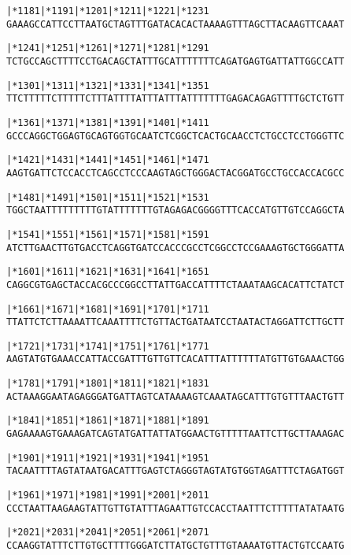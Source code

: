 \documentclass{article}
\begin{document}
\begin{alltt}
   |*1181    |*1191    |*1201    |*1211    |*1221    |*1231 
GAAAGCCATTCCTTAATGCTAGTTTGATACACACTAAAAGTTTAGCTTACAAGTTCAAAT

   |*1241    |*1251    |*1261    |*1271    |*1281    |*1291 
TCTGCCAGCTTTTCCTGACAGCTATTTGCATTTTTTTCAGATGAGTGATTATTGGCCATT

   |*1301    |*1311    |*1321    |*1331    |*1341    |*1351 
TTCTTTTTCTTTTTCTTTATTTTATTTATTTATTTTTTTGAGACAGAGTTTTGCTCTGTT

   |*1361    |*1371    |*1381    |*1391    |*1401    |*1411 
GCCCAGGCTGGAGTGCAGTGGTGCAATCTCGGCTCACTGCAACCTCTGCCTCCTGGGTTC

   |*1421    |*1431    |*1441    |*1451    |*1461    |*1471 
AAGTGATTCTCCACCTCAGCCTCCCAAGTAGCTGGGACTACGGATGCCTGCCACCACGCC

   |*1481    |*1491    |*1501    |*1511    |*1521    |*1531 
TGGCTAATTTTTTTTTGTATTTTTTTGTAGAGACGGGGTTTCACCATGTTGTCCAGGCTA

   |*1541    |*1551    |*1561    |*1571    |*1581    |*1591 
ATCTTGAACTTGTGACCTCAGGTGATCCACCCGCCTCGGCCTCCGAAAGTGCTGGGATTA

   |*1601    |*1611    |*1621    |*1631    |*1641    |*1651 
CAGGCGTGAGCTACCACGCCCGGCCTTATTGACCATTTTCTAAATAAGCACATTCTATCT

   |*1661    |*1671    |*1681    |*1691    |*1701    |*1711 
TTATTCTCTTAAAATTCAAATTTTCTGTTACTGATAATCCTAATACTAGGATTCTTGCTT

   |*1721    |*1731    |*1741    |*1751    |*1761    |*1771 
AAGTATGTGAAACCATTACCGATTTGTTGTTCACATTTATTTTTTATGTTGTGAAACTGG

   |*1781    |*1791    |*1801    |*1811    |*1821    |*1831 
ACTAAAGGAATAGAGGGATGATTAGTCATAAAAGTCAAATAGCATTTGTGTTTAACTGTT

   |*1841    |*1851    |*1861    |*1871    |*1881    |*1891 
GAGAAAAGTGAAAGATCAGTATGATTATTATGGAACTGTTTTTAATTCTTGCTTAAAGAC

   |*1901    |*1911    |*1921    |*1931    |*1941    |*1951 
TACAATTTTAGTATAATGACATTTGAGTCTAGGGTAGTATGTGGTAGATTTCTAGATGGT

   |*1961    |*1971    |*1981    |*1991    |*2001    |*2011 
CCCTAATTAAGAAGTATTGTTGTATTTAGAATTGTCCACCTAATTTCTTTTTATATAATG

   |*2021    |*2031    |*2041    |*2051    |*2061    |*2071 
CCAAGGTATTTCTTGTGCTTTTGGGATCTTATGCTGTTTGTAAAATGTTACTGTCCAATG

\end{alltt}
\newpage
\end{document}
